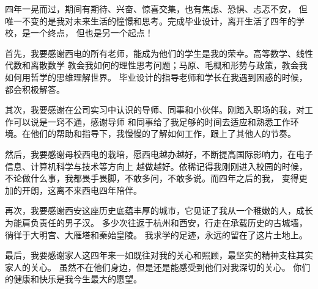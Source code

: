 \begin{thanksfor}
    四年一晃而过，期间有期待、兴奋、惊喜交集，也有焦虑、恐惧、忐忑不安，
    但唯一不变的是我对未来生活的憧憬和思考。完成毕业设计，离开生活了四年的学校，是一个终点，
    但也是另一个起点！

    首先，我要感谢西电的所有老师，能成为他们的学生是我的荣幸。高等数学、线性代数和离散数学
    教会我如何的理性思考问题；马原、毛概和形势与政策，教会我如何用哲学的思维理解世界。
    毕业设计的指导老师和学长在我遇到困惑的时候，都会积极解答。

    其次，我要感谢在公司实习中认识的导师、同事和小伙伴。刚踏入职场的我，对工作可以说是一窍不通，感谢导师
    和同事给了我足够的时间去适应和熟悉工作环境。在他们的帮助和指导下，我慢慢的了解如何工作，跟上了其他人的节奏。

    然后，我要感谢母校西电的栽培，愿西电越办越好，不断提高国际影响力，在电子信息、计算机科学与技术等方向上
    越做越好。依稀记得我刚刚进入校园的时候，不论做什么事，我都畏手畏脚，不敢多问，不敢多说。而四年之后的我，
    变得更加的开朗，这离不来西电四年陪伴。

    再次，我要感谢西安这座历史底蕴丰厚的城市，它见证了我从一个稚嫩的人，成长为能肩负责任的男子汉。
    多少次往返于杭州和西安，行走在承载历史的古城墙，徜徉于大明宫、大雁塔和秦始皇陵。
    我求学的足迹，永远的留在了这片土地上。

    最后，我要感谢家人这四年来一如既往对我的关心和照顾，最坚实的精神支柱其实家人的关心。
    虽然不在他们身边，但是还是能感受到他们对我深切的关心。
    你们的健康和快乐是我今生最大的愿望。

\end{thanksfor}